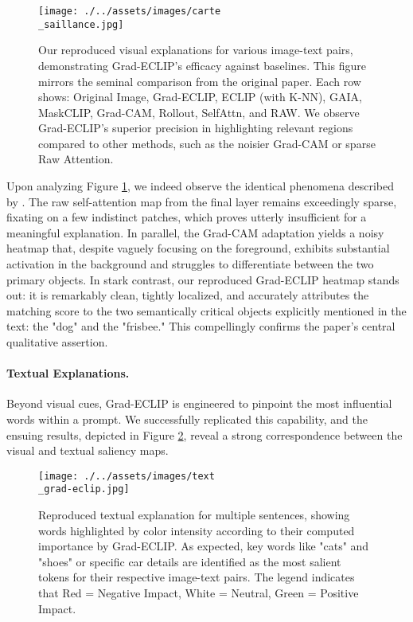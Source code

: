 \documentclass[10pt]{article} %
\begin{document}
\begin{figure}[h!]
\centering
\texttt{[image: ./../assets/images/carte\\\_saillance.jpg]}
\caption{Our reproduced visual explanations for various image-text pairs, demonstrating Grad-ECLIP's efficacy against baselines. This figure mirrors the seminal comparison from the original paper. Each row shows: Original Image, Grad-ECLIP, ECLIP (with K-NN), GAIA, MaskCLIP, Grad-CAM, Rollout, SelfAttn, and RAW. We observe Grad-ECLIP's superior precision in highlighting relevant regions compared to other methods, such as the noisier Grad-CAM or sparse Raw Attention. }
\label{fig:qualitative_repro}
\end{figure}

Upon analyzing Figure \ref{fig:qualitative_repro}, we indeed observe the identical phenomena described by \citet{zhao2024grad}. The raw self-attention map from the final layer remains exceedingly sparse, fixating on a few indistinct patches, which proves utterly insufficient for a meaningful explanation. In parallel, the Grad-CAM adaptation yields a noisy heatmap that, despite vaguely focusing on the foreground, exhibits substantial activation in the background and struggles to differentiate between the two primary objects. In stark contrast, our reproduced Grad-ECLIP heatmap stands out: it is remarkably clean, tightly localized, and accurately attributes the matching score to the two semantically critical objects explicitly mentioned in the text: the "dog" and the "frisbee." This compellingly confirms the paper's central qualitative assertion.

\paragraph{Textual Explanations.}
Beyond visual cues, Grad-ECLIP is engineered to pinpoint the most influential words within a prompt. We successfully replicated this capability, and the ensuing results, depicted in Figure \ref{fig:textual_repro}, reveal a strong correspondence between the visual and textual saliency maps.

\begin{figure}[h!]
\centering
\texttt{[image: ./../assets/images/text\\\_grad-eclip.jpg]}
\caption{Reproduced textual explanation for multiple sentences, showing words highlighted by color intensity according to their computed importance by Grad-ECLIP. As expected, key words like "cats" and "shoes" or specific car details are identified as the most salient tokens for their respective image-text pairs. The legend indicates that Red = Negative Impact, White = Neutral, Green = Positive Impact. }
\label{fig:textual_repro}
\end{figure}
\end{document}
